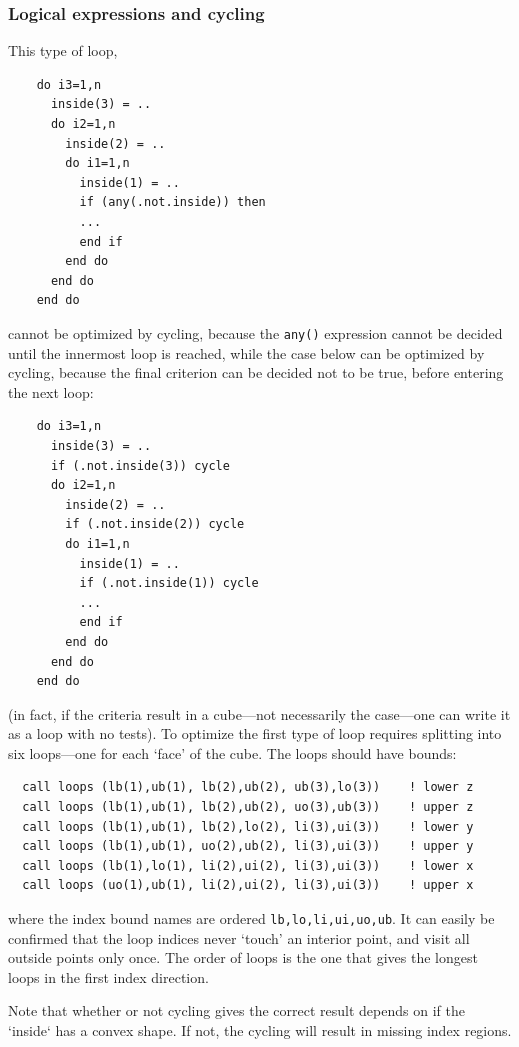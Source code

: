 \documentclass[paper=a4,fontsize=11pt]{scrartcl}
\numberwithin{equation}{section}		%
\numberwithin{figure}{section}			%
\numberwithin{table}{section}				%
\newcommand{\codecolor}{\color{Blue}}
\newcommand{\Code}[1]{{\codecolor\texttt{#1}}}
\begin{document}
\subsubsection{Logical expressions and cycling}
This type of loop,
{\codecolor\small\begin{verbatim}
    do i3=1,n
      inside(3) = ..
      do i2=1,n
        inside(2) = ..
        do i1=1,n
          inside(1) = ..
          if (any(.not.inside)) then
          ...
          end if
        end do
      end do
    end do
\end{verbatim}}
cannot be optimized by cycling, because the \Code{any()} expression cannot be decided until the innermost loop is reached, while the case below can be optimized by cycling, because the final criterion can be decided not to be true, before entering the next loop:
{\codecolor\small\begin{verbatim}
    do i3=1,n
      inside(3) = ..
      if (.not.inside(3)) cycle
      do i2=1,n
        inside(2) = ..
        if (.not.inside(2)) cycle
        do i1=1,n
          inside(1) = ..
          if (.not.inside(1)) cycle
          ...
          end if
        end do
      end do
    end do
\end{verbatim}}
(in fact, if the criteria result in a cube---not necessarily the case---one can write it as a loop with no tests).
To optimize the first type of loop requires splitting into six loops---one for each `face' of the cube.  The loops should have bounds:
{\codecolor\small\begin{verbatim}
  call loops (lb(1),ub(1), lb(2),ub(2), ub(3),lo(3))    ! lower z
  call loops (lb(1),ub(1), lb(2),ub(2), uo(3),ub(3))    ! upper z
  call loops (lb(1),ub(1), lb(2),lo(2), li(3),ui(3))    ! lower y
  call loops (lb(1),ub(1), uo(2),ub(2), li(3),ui(3))    ! upper y
  call loops (lb(1),lo(1), li(2),ui(2), li(3),ui(3))    ! lower x
  call loops (uo(1),ub(1), li(2),ui(2), li(3),ui(3))    ! upper x
\end{verbatim}}
where the index bound names are ordered \Code{lb,lo,li,ui,uo,ub}.  It can easily be confirmed that the loop indices never `touch' an interior point, and visit all outside points only once.
The order of loops is the one that gives the longest loops in the first index direction.

Note that whether or not cycling gives the correct result depends on if the `inside` has a convex shape.  If not, the cycling will result in missing index regions.

\end{document}
